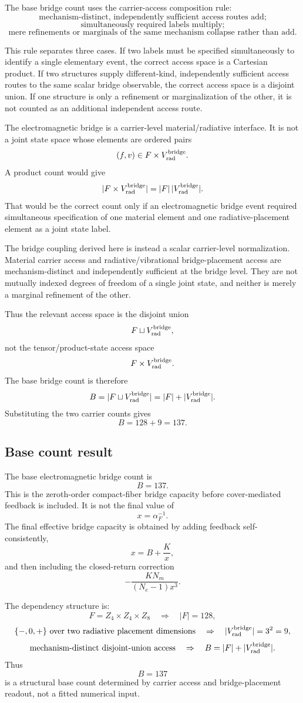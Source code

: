 The base bridge count uses the carrier-access composition rule:
\[
\boxed{
\text{mechanism-distinct, independently sufficient access routes add;}
}
\]
\[
\boxed{
\text{simultaneously required labels multiply;}
}
\]
\[
\boxed{
\text{mere refinements or marginals of the same mechanism collapse rather than add.}
}
\]

This rule separates three cases. If two labels must be specified
simultaneously to identify a single elementary event, the correct access
space is a Cartesian product. If two structures supply different-kind,
independently sufficient access routes to the same scalar bridge
observable, the correct access space is a disjoint union. If one
structure is only a refinement or marginalization of the other, it is not
counted as an additional independent access route.

The electromagnetic bridge is a carrier-level material/radiative
interface. It is not a joint state space whose elements are ordered pairs
\[
(f,v)\in F\times V_{\rm rad}^{\rm bridge}.
\]
A product count would give
\[
|F\times V_{\rm rad}^{\rm bridge}|
=
|F|\,|V_{\rm rad}^{\rm bridge}|.
\]
That would be the correct count only if an electromagnetic bridge event
required simultaneous specification of one material element and one
radiative-placement element as a joint state label.

The bridge coupling derived here is instead a scalar carrier-level
normalization. Material carrier access and radiative/vibrational
bridge-placement access are mechanism-distinct and independently
sufficient at the bridge level. They are not mutually indexed degrees of
freedom of a single joint state, and neither is merely a marginal
refinement of the other.

Thus the relevant access space is the disjoint union
\[
F\sqcup V_{\rm rad}^{\rm bridge},
\]
not the tensor/product-state access space
\[
F\times V_{\rm rad}^{\rm bridge}.
\]
The base bridge count is therefore
\[
B
=
|F\sqcup V_{\rm rad}^{\rm bridge}|
=
|F|+|V_{\rm rad}^{\rm bridge}|.
\]
Substituting the two carrier counts gives
\[
B=128+9=137.
\]

\subsection{Base count result}

The base electromagnetic bridge count is
\[
\boxed{
B=137.
}
\]
This is the zeroth-order compact-fiber bridge capacity before
cover-mediated feedback is included. It is not the final value of
\[
x=\alpha_F^{-1}.
\]
The final effective bridge capacity is obtained by adding feedback
self-consistently,
\[
x=B+\frac{K}{x},
\]
and then including the closed-return correction
\[
-\frac{K N_m}{(N_e-1)x^3}.
\]

The dependency structure is:
\[
F=Z_4\times Z_4\times Z_8
\quad\Rightarrow\quad
|F|=128,
\]
\[
\{-,0,+\}\ \text{over two radiative placement dimensions}
\quad\Rightarrow\quad
|V_{\rm rad}^{\rm bridge}|=3^2=9,
\]
\[
\text{mechanism-distinct disjoint-union access}
\quad\Rightarrow\quad
B=|F|+|V_{\rm rad}^{\rm bridge}|.
\]
Thus
\[
\boxed{
B=137
}
\]
is a structural base count determined by carrier access and
bridge-placement readout, not a fitted numerical input.